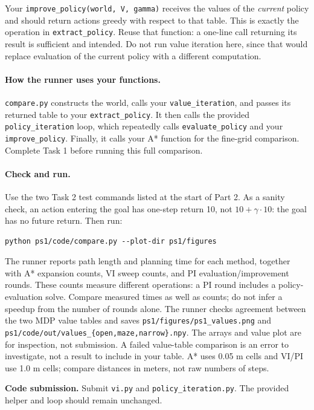 \documentclass[11pt]{article}
\begin{document}
Your \texttt{improve\_policy(world, V, gamma)} receives the values of
the \emph{current} policy and should return actions greedy with respect
to that table. This is exactly the operation in \texttt{extract\_policy}.
Reuse that function: a one-line call returning its result is sufficient
and intended. Do not run value iteration here, since that would replace
evaluation of the current policy with a different computation.

\paragraph{How the runner uses your functions.}
\texttt{compare.py} constructs the world, calls your
\texttt{value\_iteration}, and passes its returned table to your
\texttt{extract\_policy}. It then calls the provided
\texttt{policy\_iteration} loop, which repeatedly calls
\texttt{evaluate\_policy} and your \texttt{improve\_policy}.
Finally, it calls your A* function for the fine-grid comparison.
Complete Task 1 before running this full comparison.

\paragraph{Check and run.}
Use the two Task 2 test commands listed at the start of Part 2. As a
sanity check, an action entering the goal has one-step return 10,
not $10+\gamma\cdot10$: the goal has no future return. Then run:
\begin{lstlisting}
python ps1/code/compare.py --plot-dir ps1/figures
\end{lstlisting}

The runner reports path length and
planning time for each method, together with A* expansion counts, VI
sweep counts, and PI evaluation/improvement rounds. These counts measure
different operations: a PI round includes a policy-evaluation solve.
Compare measured times as well as counts; do not infer a speedup from
the number of rounds alone. The runner checks agreement between the
two MDP value tables and saves \texttt{ps1/figures/ps1\_values.png} and
\texttt{ps1/code/out/values\_\{open,maze,narrow\}.npy}.
The arrays and value plot are for inspection, not submission. A failed value-table
comparison is an error to investigate, not a result to include in your
table. A* uses 0.05 m cells and VI/PI use 1.0 m cells; compare distances
in meters, not raw numbers of steps.

\textbf{Code submission.} Submit \texttt{vi.py} and
\texttt{policy\_iteration.py}. The provided helper and loop should remain unchanged.
\end{document}
